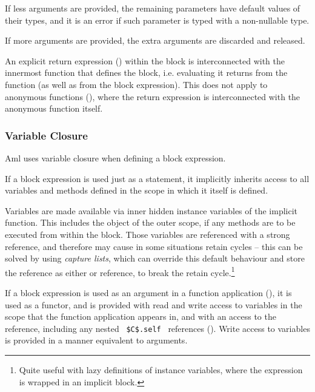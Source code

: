 If less arguments are provided, the remaining parameters have default values of their types, and it is an error if such parameter is typed with a non-nullable type. 

If more arguments are provided, the extra arguments are discarded and released. 

An explicit return expression () within the block is interconnected with the innermost function that defines the block, i.e. evaluating it returns from the function (as well as from the block expression). This does not apply to anonymous functions (), where the return expression is interconnected with the anonymous function itself. 






\subsubsection{Variable Closure}
\label{sec:variable-closure}

Aml uses variable closure when defining a block expression. 

If a block expression is used just as a statement, it implicitly inherits access to all variables and methods defined in the scope in which it itself is defined. 

Variables are made available via inner hidden instance variables of the implicit function. This includes the  object of the outer scope, if any methods are to be executed from within the block. Those variables are referenced with a strong reference, and therefore may cause in some situations retain cycles -- this can be solved by using {\em capture lists}, which can override this default behaviour and store the reference as either  or  reference, to break the retain cycle.\footnote{Quite useful with lazy definitions of instance variables, where the expression is wrapped in an implicit block.} 

If a block expression is used as an argument in a function application (), it is used as a functor, and is provided with read and write access to variables in the scope that the function application appears in, and with an access to the  reference, including any nested ~\lstinline!$C$.self!~ references (). Write access to variables is provided in a manner equivalent to  arguments. 

